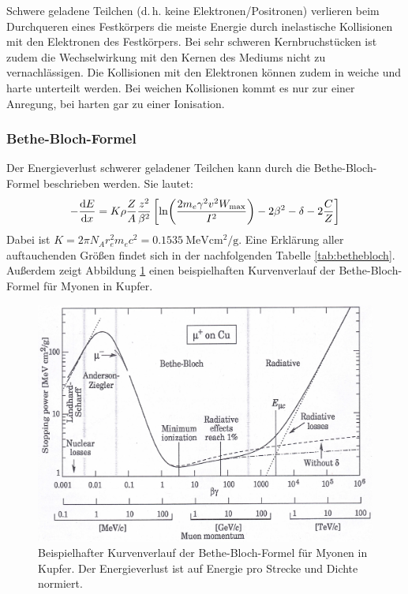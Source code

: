 Schwere geladene Teilchen (d.\,h. keine Elektronen/Positronen) verlieren beim Durchqueren eines Festkörpers die meiste Energie durch inelastische Kollisionen mit den Elektronen des Festkörpers.
Bei sehr schweren Kernbruchstücken ist zudem die Wechselwirkung mit den Kernen des Mediums nicht zu vernachlässigen.
Die Kollisionen mit den Elektronen können zudem in weiche und harte unterteilt werden.
Bei weichen Kollisionen kommt es nur zur einer Anregung, bei harten gar zu einer Ionisation.

\subsubsection{Bethe-Bloch-Formel}

Der Energieverlust schwerer geladener Teilchen kann durch die Bethe-Bloch-Formel beschrieben werden.
Sie lautet:
\begin{align}
	\label{eq:bethebloch}
	-\dv{E}{x}=K\rho \frac{Z}{A}\frac{z^2}{\beta^2}\left[ \ln(\frac{2m_e\gamma^2v^2W_\text{max}}{I^2})-2\beta^2-\delta -2\frac{C}{Z}\right] 
\end{align}
Dabei ist $K=2\pi N_A r_e^2m_ec^2= \SI[per-mode=reciprocal-positive-first]{0.1535}{\mega\electronvolt\centi\meter\squared\per\gram}$.
Eine Erklärung aller auftauchenden Größen findet sich in der nachfolgenden Tabelle \ref{tab:bethebloch}.
Außerdem zeigt Abbildung \ref{bethebloch} einen beispielhaften Kurvenverlauf der Bethe-Bloch-Formel für Myonen in Kupfer.

\begin{figure}[h]
	\centering
	\includegraphics[width=\textwidth]{img/BetheBloch}
	\caption{Beispielhafter Kurvenverlauf der Bethe-Bloch-Formel für Myonen in Kupfer. Der Energieverlust ist auf Energie pro Strecke und Dichte normiert. \cite{bethebloch}}
	\label{bethebloch}
\end{figure}

